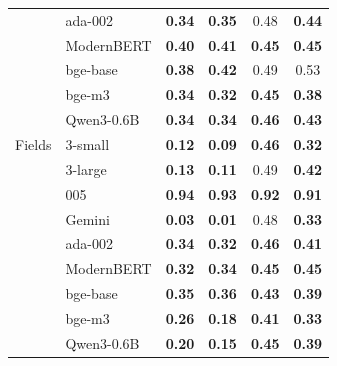 \begin{table}[htbp]
\begin{tabular}{llcccc}
 & ada-002 & \cellcolor{tabB!15}\textbf{0.34} & \cellcolor{tabB!14}\textbf{0.35} & 0.48 & \cellcolor{tabB!5}\textbf{0.44} \\
 & ModernBERT & \cellcolor{tabB!9}\textbf{0.40} & \cellcolor{tabB!8}\textbf{0.41} & \cellcolor{tabB!5}\textbf{0.45} & \cellcolor{tabB!4}\textbf{0.45} \\
 & bge-base & \cellcolor{tabB!11}\textbf{0.38} & \cellcolor{tabB!7}\textbf{0.42} & 0.49 & \cellcolor{tabV!3}0.53 \\
 & bge-m3 & \cellcolor{tabB!15}\textbf{0.34} & \cellcolor{tabB!16}\textbf{0.32} & \cellcolor{tabB!5}\textbf{0.45} & \cellcolor{tabB!10}\textbf{0.38} \\
 & Qwen3-0.6B & \cellcolor{tabB!15}\textbf{0.34} & \cellcolor{tabB!15}\textbf{0.34} & \cellcolor{tabB!4}\textbf{0.46} & \cellcolor{tabB!6}\textbf{0.43} \\
\midrule
Fields & 3-small & \cellcolor{tabB!34}\textbf{0.12} & \cellcolor{tabB!37}\textbf{0.09} & \cellcolor{tabB!4}\textbf{0.46} & \cellcolor{tabB!16}\textbf{0.32} \\
 & 3-large & \cellcolor{tabB!34}\textbf{0.13} & \cellcolor{tabB!35}\textbf{0.11} & 0.49 & \cellcolor{tabB!7}\textbf{0.42} \\
 & 005 & \cellcolor{tabV!40}\textbf{0.94} & \cellcolor{tabV!38}\textbf{0.93} & \cellcolor{tabV!37}\textbf{0.92} & \cellcolor{tabV!37}\textbf{0.91} \\
 & Gemini & \cellcolor{tabB!42}\textbf{0.03} & \cellcolor{tabB!44}\textbf{0.01} & \cellcolor{tabB!2}0.48 & \cellcolor{tabB!15}\textbf{0.33} \\
 & ada-002 & \cellcolor{tabB!15}\textbf{0.34} & \cellcolor{tabB!17}\textbf{0.32} & \cellcolor{tabB!4}\textbf{0.46} & \cellcolor{tabB!8}\textbf{0.41} \\
 & ModernBERT & \cellcolor{tabB!16}\textbf{0.32} & \cellcolor{tabB!15}\textbf{0.34} & \cellcolor{tabB!4}\textbf{0.45} & \cellcolor{tabB!4}\textbf{0.45} \\
 & bge-base & \cellcolor{tabB!13}\textbf{0.35} & \cellcolor{tabB!13}\textbf{0.36} & \cellcolor{tabB!6}\textbf{0.43} & \cellcolor{tabB!10}\textbf{0.39} \\
 & bge-m3 & \cellcolor{tabB!21}\textbf{0.26} & \cellcolor{tabB!29}\textbf{0.18} & \cellcolor{tabB!8}\textbf{0.41} & \cellcolor{tabB!16}\textbf{0.33} \\
 & Qwen3-0.6B & \cellcolor{tabB!27}\textbf{0.20} & \cellcolor{tabB!31}\textbf{0.15} & \cellcolor{tabB!4}\textbf{0.45} & \cellcolor{tabB!10}\textbf{0.39} \\

\end{tabular}
\end{table}
